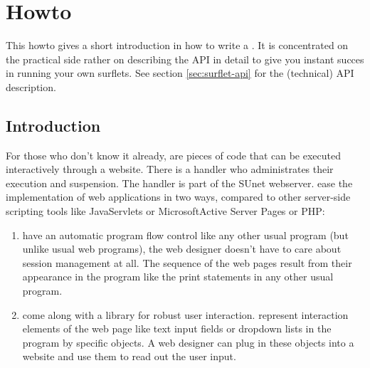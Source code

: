 
\section{Howto}
\label{sec:surflethowto}

This howto gives a short introduction in how to write a \surflet.  It
is concentrated on the practical side rather on describing the
\surflet API in detail to give you instant succes in running your own
surflets.  See section \ref{sec:surflet-api} for the (technical) API
description. 

\subsection{Introduction}
For those who don't know it already, \surflets are pieces of code that
can be executed interactively through a website.  There is a \surflet
handler who administrates their execution and suspension.  The
\surflet handler is part of the SUnet webserver.  \surflets ease the
implementation of web applications in two ways, compared to other
server-side scripting tools like Java\texttrademark Servlets or
Microsoft\textregistered Active Server Pages or PHP:

\begin{enumerate}
\item  \surflets have an automatic program flow control like any
other usual program (but unlike usual web programs), \ie the web
designer doesn't have to care about session management at all. The
sequence of the web pages result from their appearance in the program
like the print statements in any other usual program.

\item  \surflets come along with a library for robust user
interaction.  \surflets represent interaction elements of the web page
like text input fields or dropdown lists in the \surflet program by
specific objects.  A web designer can plug in these objects into a
website and use them to read out the user input.
\end{enumerate}

